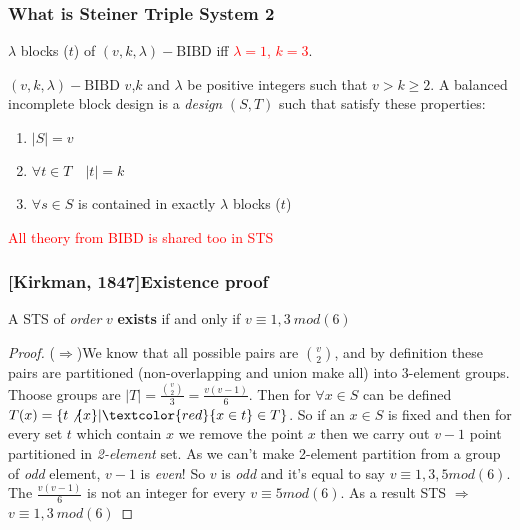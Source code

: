	\begin{frame}
	\frametitle{What is Steiner Triple System 2}
	
	$\lambda$ blocks ($t$) of $(v,k,\lambda)-\mathrm{BIBD}$ iff \textcolor{red}{$\lambda = 1$, $k=3$}.
	
	\begin{block}{$(v,k,\lambda)-\mathrm{BIBD}$}
		$v$,$k$ and $\lambda$ be positive integers such that $v > k \ge 2$. A balanced incomplete block design is a \textit{design} $(S,T)$ such that satisfy these properties:
		\begin{enumerate}
			\item $|S|=v$
			\item $\forall t \in T\quad |t|= k $
			\item $\forall s \in S$ is contained in exactly $\lambda$ blocks ($t$) 
		\end{enumerate}
	\end{block}
	\pause
	\textcolor{red}{All theory from BIBD is shared too in STS}
	
	\end{frame}


\begin{frame}
	\frametitle{[Kirkman, 1847]Existence proof}
	\begin{theorem}
		A STS of \textit{order} $v$ \textbf{exists} if and only if $v\equiv 1,3\ mod(6)$  
	\end{theorem}
	\begin{proof}
		($\Rightarrow$)We know that all possible pairs are $\binom{v}{2}$, and by definition these pairs are partitioned (non-overlapping and union make all) into 3-element groups. Thoose groups are $|T|=\frac{\binom{v}{2}}{3}=\frac{v(v-1)}{6}$. Then for $\forall x \in S$ can be defined $T(x) = \{ t\not\{x\} | \textcolor{red}{x \in t} \in T \}$. So if an $x \in S$ is fixed and then for every set $t$ which contain $x$ we remove the point $x$ then we carry out $v-1$ point partitioned in \textit{2-element} set. As we can't make 2-element partition from a group of \textit{odd} element, $v-1$ is \textit{even}! So $v$ is \textit{odd} and it's equal to say $v \equiv 1,3,5 mod(6)$. The $\frac{v(v-1)}{6}$ is not an integer for every $v \equiv 5 mod(6)$. As a result STS $\Rightarrow$ $v\equiv 1,3\ mod(6)$
	\end{proof}
\end{frame}

